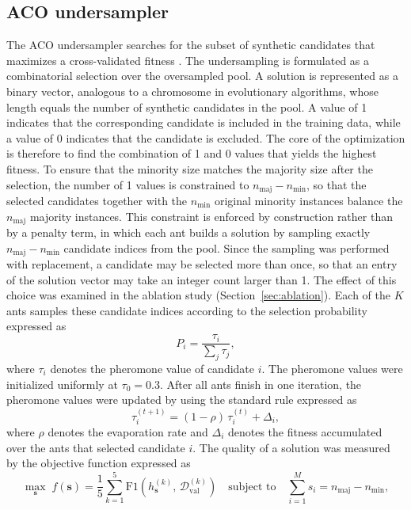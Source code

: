 \documentclass[10pt,a4paper]{article}
\begin{document}
\subsection{ACO undersampler}
\label{sec:aco}
The ACO undersampler searches for the subset of synthetic candidates that
maximizes a cross-validated fitness \citep{dorigo2006ant,
yu2013acosampling}. The undersampling is formulated as a combinatorial
selection over the oversampled pool. A solution is represented as a
binary vector, analogous to a chromosome in evolutionary algorithms,
whose length equals the number of synthetic candidates in the pool. A
value of 1 indicates that the corresponding candidate is included in the
training data, while a value of 0 indicates that the candidate is
excluded. The core of the optimization is therefore to find the
combination of 1 and 0 values that yields the highest fitness. To ensure
that the minority size matches the majority size after the selection,
the number of 1 values is constrained to $n_{\mathrm{maj}} - n_{\min}$,
so that the selected candidates together with the $n_{\min}$ original
minority instances balance the $n_{\mathrm{maj}}$ majority instances.
This constraint is enforced by construction rather than by a penalty
term, in which each ant builds a solution by sampling exactly
$n_{\mathrm{maj}} - n_{\min}$ candidate indices from the pool. Since the
sampling was performed with replacement, a candidate may be selected
more than once, so that an entry of the solution vector may take an
integer count larger than 1. The effect of this choice was examined in
the ablation study (Section~\ref{sec:ablation}). Each of the $K$ ants
samples these candidate indices according to the selection probability
expressed as
\begin{equation}
  P_i = \frac{\tau_i}{\sum_{j} \tau_j},
  \label{eq:prob}
\end{equation}
where $\tau_i$ denotes the pheromone value of candidate $i$. The
pheromone values were initialized uniformly at $\tau_0 = 0.3$. After all
ants finish in one iteration, the pheromone values were updated by using
the standard rule expressed as
\begin{equation}
  \tau_i^{(t+1)} = (1-\rho)\,\tau_i^{(t)} + \Delta_i,
  \label{eq:pheromone}
\end{equation}
where $\rho$ denotes the evaporation rate and $\Delta_i$ denotes the
fitness accumulated over the ants that selected candidate $i$. The
quality of a solution was measured by the objective function expressed
as
\begin{equation}
  \max_{\mathbf{s}}\; f(\mathbf{s}) = \frac{1}{5}\sum_{k=1}^{5}
  \mathrm{F1}\!\left(h_{\mathbf{s}}^{(k)},\,
  \mathcal{D}_{\mathrm{val}}^{(k)}\right)
  \quad \text{subject to} \quad
  \sum_{i=1}^{M} s_i = n_{\mathrm{maj}} - n_{\min},
  \label{eq:objective}
\end{equation}
\end{document}
